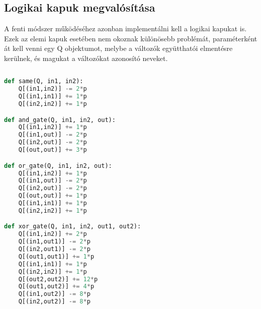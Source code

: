 \subsection{Logikai kapuk megvalósítása}

A fenti módszer működéséhez azonban implementálni kell a logikai kapukat is.
Ezek az elemi kapuk esetében nem okoznak különösebb problémát, paraméterként át kell venni egy Q objektumot, melybe a változók együtthatói elmentésre kerülnek, és magukat a változókat azonosító neveket.

\begin{lstlisting}[language=python,caption=Elemi kapuk,label=code:ElementaryGates]
	
def same(Q, in1, in2):
	Q[(in1,in2)] -= 2*p
	Q[(in1,in1)] += 1*p
	Q[(in2,in2)] += 1*p

def and_gate(Q, in1, in2, out):
	Q[(in1,in2)] += 1*p
	Q[(in1,out)] -= 2*p
	Q[(in2,out)] -= 2*p
	Q[(out,out)] += 3*p

def or_gate(Q, in1, in2, out):
	Q[(in1,in2)] += 1*p
	Q[(in1,out)] -= 2*p
	Q[(in2,out)] -= 2*p
	Q[(out,out)] += 1*p
	Q[(in1,in1)] += 1*p
	Q[(in2,in2)] += 1*p

def xor_gate(Q, in1, in2, out1, out2):
	Q[(in1,in2)] += 2*p
	Q[(in1,out1)] -= 2*p
	Q[(in2,out1)] -= 2*p
	Q[(out1,out1)] += 1*p
	Q[(in1,in1)] += 1*p
	Q[(in2,in2)] += 1*p
	Q[(out2,out2)] += 12*p
	Q[(out1,out2)] += 4*p
	Q[(in1,out2)] -= 8*p
	Q[(in2,out2)] -= 8*p
	
\end{lstlisting}